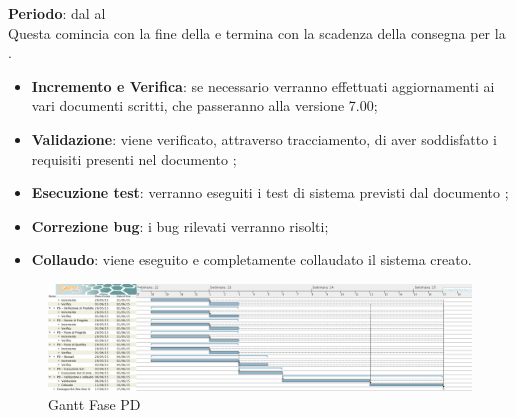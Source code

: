 	\textbf{Periodo}: dal  al  \\Questa {} comincia con la fine della  e termina con la scadenza della consegna per la .
	\begin{itemize}
		\item \textbf{Incremento e Verifica}: se necessario verranno effettuati aggiornamenti ai vari documenti scritti, che passeranno alla versione 7.00;
		\item \textbf{Validazione}: viene verificato, attraverso tracciamento, di aver soddisfatto i requisiti presenti nel documento ;
		\item \textbf{Esecuzione test}: verranno eseguiti i test di sistema previsti dal documento ;
		\item \textbf{Correzione bug}: i bug rilevati verranno risolti;
		\item \textbf{Collaudo}: viene eseguito e completamente collaudato il sistema creato.
	\end{itemize}
		\begin{figure}[H]\centering
			\includegraphics[width=\textwidth]{PianoDiProgetto/Pics/FasePD.png}
		\caption{Gantt Fase PD}
\end{figure}
